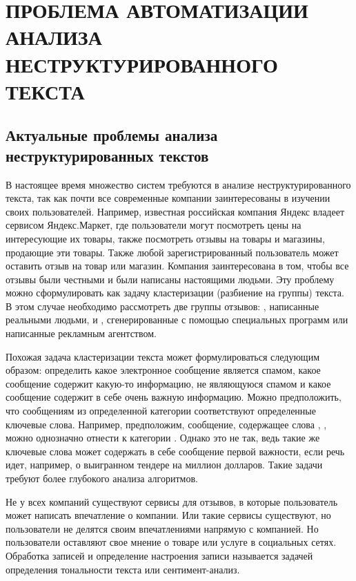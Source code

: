 
\chapter{ПРОБЛЕМА АВТОМАТИЗАЦИИ АНАЛИЗА НЕСТРУКТУРИРОВАННОГО ТЕКСТА}

\section{Актуальные проблемы анализа неструктурированных текстов}

В настоящее время множество систем требуются в анализе неструктурированного текста, так как почти все современные компании заинтересованы в изучении своих пользователей. Например, известная российская компания Яндекс владеет сервисом Яндекс.Маркет, где пользователи могут посмотреть цены на интересующие их товары, также посмотреть отзывы на товары и магазины, продающие эти товары. Также любой зарегистрированный пользователь может оставить отзыв на товар или магазин. Компания заинтересована в том, чтобы все отзывы были честными и были написаны настоящими людьми. Эту проблему можно сформулировать как задачу кластеризации (разбиение на группы) текста. В этом случае необходимо рассмотреть две группы отзывов: , написанные реальными людьми, и , сгенерированные с помощью специальных программ или написанные рекламным агентством.

Похожая задача кластеризации текста может формулироваться следующим образом: определить какое электронное сообщение является спамом, какое сообщение содержит какую-то информацию, не являющуюся спамом и какое сообщение содержит в себе очень важную информацию. Можно предположить, что сообщениям из определенной категории соответствуют определенные ключевые слова. Например, предположим, сообщение, содержащее слова , ,  можно однозначно отнести к категории . Однако это не так, ведь такие же ключевые слова может содержать в себе сообщение первой важности, если речь идет, например, о выигранном тендере на миллион долларов. Такие задачи требуют более глубокого анализа алгоритмов.

Не у всех компаний существуют сервисы для отзывов, в которые пользователь может написать впечатление о компании. Или такие сервисы существуют, но пользователи не делятся своим впечатлениями напрямую с компанией. Но пользователи оставляют свое мнение о товаре или услуге в социальных сетях. Обработка записей и определение настроения записи называется задачей определения тональности текста или сентимент-анализ.

